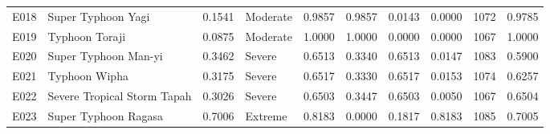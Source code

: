 \begin{tabular}{llllllllll}
E018 & Super Typhoon Yagi & 0.1541 & Moderate & 0.9857 & 0.9857 & 0.0143 & 0.0000 & 1072 & 0.9785 \\
E019 & Typhoon Toraji & 0.0875 & Moderate & 1.0000 & 1.0000 & 0.0000 & 0.0000 & 1067 & 1.0000 \\
E020 & Super Typhoon Man-yi & 0.3462 & Severe & 0.6513 & 0.3340 & 0.6513 & 0.0147 & 1083 & 0.5900 \\
E021 & Typhoon Wipha & 0.3175 & Severe & 0.6517 & 0.3330 & 0.6517 & 0.0153 & 1074 & 0.6257 \\
E022 & Severe Tropical Storm Tapah & 0.3026 & Severe & 0.6503 & 0.3447 & 0.6503 & 0.0050 & 1067 & 0.6504 \\
E023 & Super Typhoon Ragasa & 0.7006 & Extreme & 0.8183 & 0.0000 & 0.1817 & 0.8183 & 1085 & 0.7005 \\
\hline
\end{tabular}